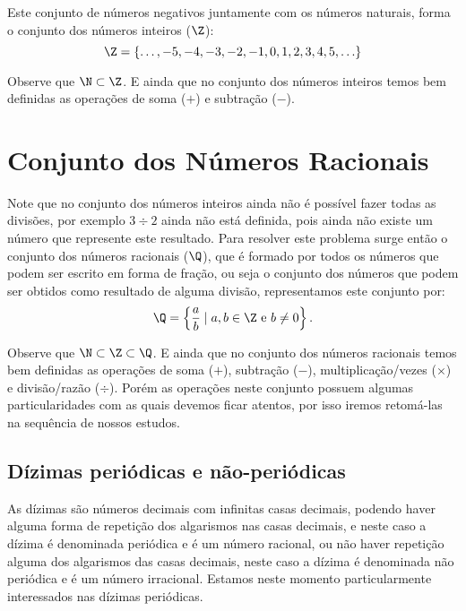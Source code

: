 Este conjunto de números negativos juntamente com os números naturais, forma o conjunto dos números inteiros ($\Z$):
\begin{equation}
\Z= \{ \ldots , -5, -4, -3, -2, -1, 0, 1, 2, 3, 4, 5, \ldots \}
\end{equation}

Observe que $\N \subset \Z$. E ainda que no conjunto dos números inteiros temos bem definidas as operações de soma ($+$) e subtração ($-$).

\section{Conjunto dos Números Racionais}

Note que no conjunto dos números inteiros ainda não é possível fazer todas as divisões, por exemplo $3 \div 2$ ainda não está definida, pois ainda não existe um número que represente este resultado. Para resolver este problema surge então o conjunto dos números racionais ($\Q$), que é formado por todos os números que podem ser escrito em forma de fração, ou seja o conjunto dos números que podem ser obtidos como resultado de alguma divisão, representamos este conjunto por:
\begin{equation}
\Q= \left\{ \frac{a}{b} \mid a, b \in \Z \text{ e } b \neq 0 \right\}.
\end{equation}

Observe que $\N \subset \Z \subset \Q$. E ainda que no conjunto dos números racionais temos bem definidas as operações de soma ($+$), subtração ($-$), multiplicação/vezes ($\times$) e divisão/razão ($\div$). Porém as operações neste conjunto possuem algumas particularidades com as quais devemos ficar atentos, por isso iremos retomá-las na sequência de nossos estudos.

\subsection{Dízimas periódicas e não-periódicas}
As dízimas são números decimais com infinitas casas decimais, podendo haver alguma forma de repetição dos algarismos nas casas decimais, e neste caso a dízima é denominada periódica e é um número racional, ou não haver repetição alguma dos algarismos das casas decimais, neste caso a dízima é denominada não periódica e é um número irracional. Estamos neste momento particularmente interessados nas dízimas periódicas.

